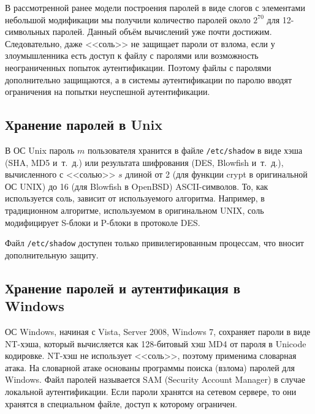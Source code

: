 В рассмотренной ранее модели построения паролей в виде слогов с элементами небольшой модификации мы получили количество паролей около $2^{70}$ для 12-символьных паролей. Данный объём вычислений уже почти достижим. Следовательно, даже <<соль>> не защищает пароли от взлома, если у злоумышленника есть доступ к файлу с паролями или возможность неограниченных попыток аутентификации. Поэтому файлы с паролями дополнительно защищаются, а в системы аутентификации по паролю вводят ограничения на попытки неуспешной аутентификации.

\subsection[Unix]{Хранение паролей в Unix}

В ОС Unix пароль $m$ пользователя хранится в файле \texttt{/etc/shadow} в виде хэша (SHA, MD5 и~т.~д.) или результата шифрования (DES, Blowfish и~т.~д.), вычисленного с <<солью>> $s$ длиной от 2 (для функции crypt в оригинальной ОС UNIX) до 16 (для Blowfish в OpenBSD) ASCII-символов. То, как используется соль, зависит от используемого алгоритма. Например, в традиционном алгоритме, используемом в оригинальном UNIX, соль модифицирует S-блоки и P-блоки в протоколе DES.

Файл \texttt{/etc/shadow} доступен только привилегированным процессам, что вносит дополнительную защиту.


\subsection[Windows]{Хранение паролей и аутентификация в \protect\\ Windows}


ОС Windows, начиная с Vista, Server 2008, Windows 7, сохраняет пароли в виде NT-хэша, который вычисляется как 128-битовый хэш MD4 от пароля в Unicode кодировке. NT-хэш не использует <<соль>>, поэтому применима словарная атака. На словарной атаке основаны программы поиска (взлома) паролей для Windows. Файл паролей называется SAM (Security Account Manager) в случае локальной аутентификации. Если пароли хранятся на сетевом сервере, то они хранятся в специальном файле, доступ к которому ограничен.

